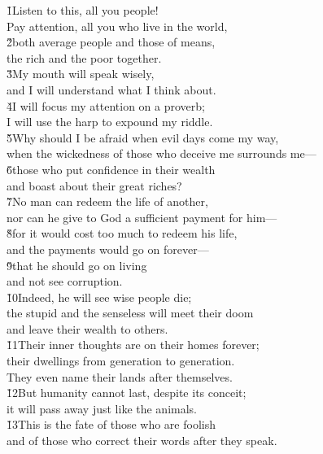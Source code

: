 \begin{poetry}
\poeml \v{1}Listen to this, all you people! \\
\poemll    Pay attention, all you who live in the world, \\
\poeml \v{2}both average people and those of means, \\
\poemll    the rich and the poor together. \\
\poeml \v{3}My mouth will speak wisely, \\
\poemll    and I will understand what I think about. \\
\poeml \v{4}I will focus my attention on a proverb; \\
\poemll    I will use the harp to expound my riddle. \\
\poeml \v{5}Why should I be afraid when evil days come my way, \\
\poemll    when the wickedness of those who deceive me surrounds me--- \\
\poeml \v{6}those who put confidence in their wealth \\
\poemll    and boast about their great riches? \\
\poeml \v{7}No man can redeem the life of another, \\
\poemll    nor can he give to God a sufficient payment for him--- \\
\poeml \v{8}for it would cost too much to redeem his life, \\
\poemll    and the payments would go on forever--- \\
\poeml \v{9}that he should go on living \\
\poemll    and not see corruption. \\
\poeml \v{10}Indeed, he will see wise people die; \\
\poemll    the stupid and the senseless will meet their doom \\
\poemlll       and leave their wealth to others. \\
\poeml \v{11}Their inner thoughts are on their homes forever; \\
\poemll    their dwellings from generation to generation. \\
\poemlll       They even name their lands after themselves. \\
\poeml \v{12}But humanity cannot last, despite its conceit; \\
\poemll    it will pass away just like the animals. \\
\poeml \v{13}This is the fate of those who are foolish \\
\poemll    and of those who correct their words after they speak.
\end{poetry}


